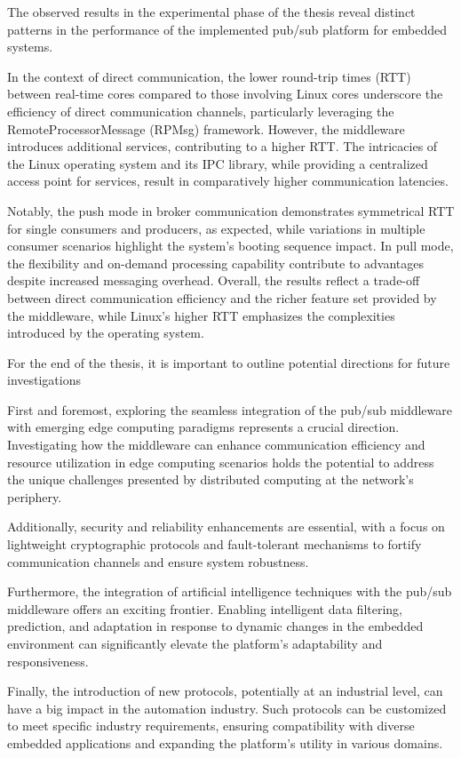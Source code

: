 The observed results in the experimental phase of the thesis reveal distinct patterns in the performance of the implemented pub/sub platform for embedded systems.

In the context of direct communication, the lower round-trip times (RTT) between real-time cores compared to those involving Linux cores underscore the efficiency of direct communication channels, particularly leveraging the RemoteProcessorMessage (RPMsg) framework. However, the middleware introduces additional services, contributing to a higher RTT. The intricacies of the Linux operating system and its IPC library, while providing a centralized access point for services, result in comparatively higher communication latencies.

Notably, the push mode in broker communication demonstrates symmetrical RTT for single consumers and producers, as expected, while variations in multiple consumer scenarios highlight the system's booting sequence impact. In pull mode, the flexibility and on-demand processing capability contribute to advantages despite increased messaging overhead. Overall, the results reflect a trade-off between direct communication efficiency and the richer feature set provided by the middleware, while Linux's higher RTT emphasizes the complexities introduced by the operating system.

For the end of the thesis, it is important to outline potential directions for
future investigations 

First and foremost, exploring the seamless integration of the pub/sub middleware with emerging edge computing paradigms represents a crucial direction. Investigating how the middleware can enhance communication efficiency and resource utilization in edge computing scenarios holds the potential to address the unique challenges presented by distributed computing at the network's periphery. 

Additionally, security and reliability enhancements are essential, with a focus on lightweight cryptographic protocols and fault-tolerant mechanisms to fortify communication channels and ensure system robustness.

Furthermore, the integration of artificial intelligence techniques with the pub/sub middleware offers an exciting frontier. Enabling intelligent data filtering, prediction, and adaptation in response to dynamic changes in the embedded environment can significantly elevate the platform's adaptability and responsiveness. 

Finally, the introduction of new protocols, potentially at an industrial level, can have a big impact in the automation industry. Such protocols can be customized to meet specific industry requirements, ensuring compatibility with diverse embedded applications and expanding the platform's utility in various domains.

